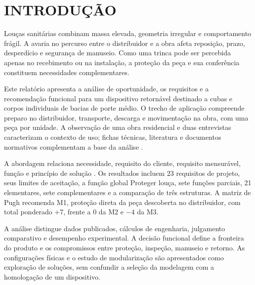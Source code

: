 \section{INTRODUÇÃO}

Louças sanitárias combinam massa elevada, geometria irregular e comportamento frágil. A avaria no percurso entre o distribuidor e a obra afeta reposição, prazo, desperdício e segurança de manuseio. Como uma trinca pode ser percebida apenas no recebimento ou na instalação, a proteção da peça e sua conferência constituem necessidades complementares.

Este relatório apresenta a análise de oportunidade, os requisitos e a recomendação funcional para um dispositivo retornável destinado a cubas e corpos individuais de bacias de porte médio. O trecho de aplicação compreende preparo no distribuidor, transporte, descarga e movimentação na obra, com uma peça por unidade. A observação de uma obra residencial e duas entrevistas caracterizam o contexto de uso; fichas técnicas, literatura e documentos normativos complementam a base da análise \citep{equipe2026,celited5,decalk}.

A abordagem relaciona necessidade, requisito do cliente, requisito mensurável, função e princípio de solução \citep{rozenfeld2006,back2008}. Os resultados incluem 23 requisitos de projeto, seus limites de aceitação, a função global Proteger louça, sete funções parciais, 21 elementares, sete complementares e a comparação de três estruturas. A matriz de Pugh recomenda M1, proteção direta da peça descoberta no distribuidor, com total ponderado +7, frente a 0 da M2 e $-4$ da M3.

A análise distingue dados publicados, cálculos de engenharia, julgamento comparativo e desempenho experimental. A decisão funcional define a fronteira do produto e os compromissos entre proteção, inspeção, manuseio e retorno. As configurações físicas e o estudo de modularização são apresentados como exploração de soluções, sem confundir a seleção da modelagem com a homologação de um dispositivo.

